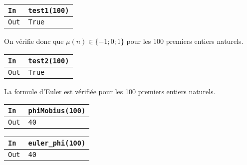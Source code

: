 \documentclass[titlepage]{article}
\begin{document}
            

            \begin{tabularx}{12cm}{|p{0.60cm}|X|}
                \hline
                \rowcolor{gray}
                \texttt{In}
                & 
                \texttt{test1(100)}
                \\
                \hline
                \texttt{Out}
                &
                \texttt{True}
                \\
                \hline
            \end{tabularx}
            \bigbreak

            On vérifie donc que $\mu (n) \in \{-1;0;1\}$ pour les 100 premiers entiers naturels.

            

            \begin{tabularx}{12cm}{|p{0.60cm}|X|}
                \hline
                \rowcolor{gray}
                \texttt{In}
                & 
                \texttt{test2(100)}
                \\
                \hline
                \texttt{Out}
                &
                \texttt{True}
                \\
                \hline
            \end{tabularx}
            \bigbreak

            La formule d'Euler est vérifiée pour les 100 premiers entiers naturels.

            

            \begin{tabularx}{12cm}{|p{0.60cm}|X|}
                \hline
                \rowcolor{gray}
                \texttt{In}
                & 
                \texttt{phiMobius(100)}
                \\
                \hline
                \texttt{Out}
                &
                \texttt{40}
                \\
                \hline
            \end{tabularx}
            \bigbreak

            \begin{tabularx}{12cm}{|p{0.60cm}|X|}
                \hline
                \rowcolor{gray}
                \texttt{In}
                & 
                \texttt{euler\_phi(100)}
                \\
                \hline
                \texttt{Out}
                &
                \texttt{40}
                \\
                \hline
            \end{tabularx}
            \bigbreak
\end{document}
